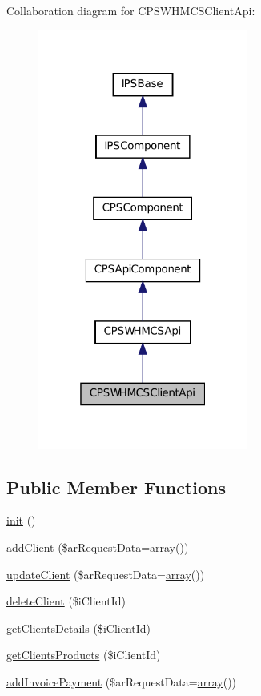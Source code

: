 Collaboration diagram for CPSWHMCSClientApi:\nopagebreak
\begin{figure}[H]
\begin{center}
\leavevmode
\includegraphics[width=196pt]{classCPSWHMCSClientApi__coll__graph}
\end{center}
\end{figure}
\subsection*{Public Member Functions}
\begin{DoxyCompactItemize}
\item 
\hyperlink{classCPSWHMCSClientApi_a4be4055f3361d4800e16bc2e2e38cda6}{init} ()
\item 
\hyperlink{classCPSWHMCSClientApi_a619bc608e1605357f83107396ee75bd7}{addClient} (\$arRequestData=\hyperlink{list_8php_aa3205d038c7f8feb5c9f01ac4dfadc88}{array}())
\item 
\hyperlink{classCPSWHMCSClientApi_a629cb6c4481550eb847f834e3010b78f}{updateClient} (\$arRequestData=\hyperlink{list_8php_aa3205d038c7f8feb5c9f01ac4dfadc88}{array}())
\item 
\hyperlink{classCPSWHMCSClientApi_a9b4a4c2071ec29da8b57507f824c1817}{deleteClient} (\$iClientId)
\item 
\hyperlink{classCPSWHMCSClientApi_a81bbebdbfaa0d2e514b5313cacd92f72}{getClientsDetails} (\$iClientId)
\item 
\hyperlink{classCPSWHMCSClientApi_a7e298e9dbfd4322701dd3b9addd1432d}{getClientsProducts} (\$iClientId)
\item 
\hyperlink{classCPSWHMCSClientApi_a431fcd2819eb9ed114e8bbb473aa782b}{addInvoicePayment} (\$arRequestData=\hyperlink{list_8php_aa3205d038c7f8feb5c9f01ac4dfadc88}{array}())
\end{DoxyCompactItemize}


